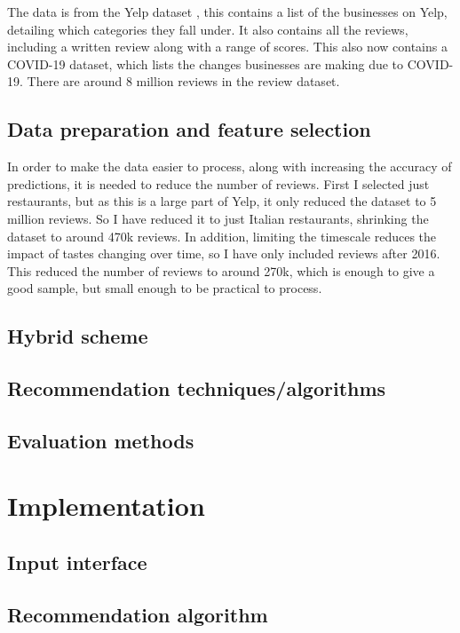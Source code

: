 \documentclass[conference]{IEEEtran}
\begin{document}
The data is from the Yelp dataset \cite{b1}, this contains a list of the businesses on Yelp, detailing which categories they fall under. It also contains all the reviews, including a written review along with a range of scores. This also now contains a COVID-19 dataset, which lists the changes businesses are making due to COVID-19. There are around 8 million reviews in the review dataset.

\subsection{Data preparation and feature selection}

In order to make the data easier to process, along with increasing the accuracy of predictions, it is needed to reduce the number of reviews. First I selected just restaurants, but as this is a large part of Yelp, it only reduced the dataset to 5 million reviews. So I have reduced it to just Italian restaurants, shrinking the dataset to around 470k reviews. In addition, limiting the timescale reduces the impact of tastes changing over time, so I have only included reviews after 2016. This reduced the number of reviews to around 270k, which is enough to give a good sample, but small enough to be practical to process.

\subsection{Hybrid scheme}

\subsection{Recommendation techniques/algorithms}

\subsection{Evaluation methods}

\section{Implementation}

\subsection{Input interface}

\subsection{Recommendation algorithm}
\end{document}

